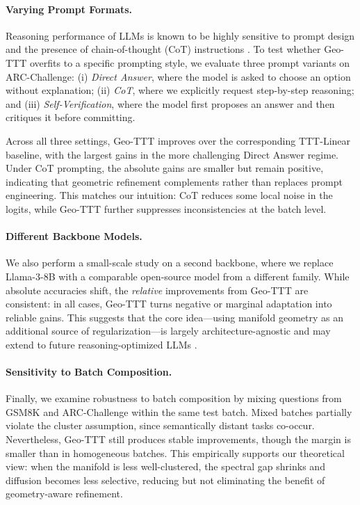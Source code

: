 \documentclass{article}
\theoremstyle{plain}
\theoremstyle{definition}
\theoremstyle{remark}
\begin{document}
\paragraph{Varying Prompt Formats.}
Reasoning performance of LLMs is known to be highly sensitive to prompt design and the presence of chain-of-thought (CoT) instructions \cite{selfconsistency2022, lightman2024let}. To test whether Geo-TTT overfits to a specific prompting style, we evaluate three prompt variants on ARC-Challenge: (i) \emph{Direct Answer}, where the model is asked to choose an option without explanation; (ii) \emph{CoT}, where we explicitly request step-by-step reasoning; and (iii) \emph{Self-Verification}, where the model first proposes an answer and then critiques it before committing.

Across all three settings, Geo-TTT improves over the corresponding TTT-Linear baseline, with the largest gains in the more challenging Direct Answer regime. Under CoT prompting, the absolute gains are smaller but remain positive, indicating that geometric refinement complements rather than replaces prompt engineering. This matches our intuition: CoT reduces some local noise in the logits, while Geo-TTT further suppresses inconsistencies at the batch level.

\paragraph{Different Backbone Models.}
We also perform a small-scale study on a second backbone, where we replace Llama-3-8B with a comparable open-source model from a different family. While absolute accuracies shift, the \emph{relative} improvements from Geo-TTT are consistent: in all cases, Geo-TTT turns negative or marginal adaptation into reliable gains. This suggests that the core idea—using manifold geometry as an additional source of regularization—is largely architecture-agnostic and may extend to future reasoning-optimized LLMs \cite{snell2024scaling, ttcsurvey2025}.

\paragraph{Sensitivity to Batch Composition.}
Finally, we examine robustness to batch composition by mixing questions from GSM8K and ARC-Challenge within the same test batch. Mixed batches partially violate the cluster assumption, since semantically distant tasks co-occur. Nevertheless, Geo-TTT still produces stable improvements, though the margin is smaller than in homogeneous batches. This empirically supports our theoretical view: when the manifold is less well-clustered, the spectral gap shrinks and diffusion becomes less selective, reducing but not eliminating the benefit of geometry-aware refinement.
\end{document}
